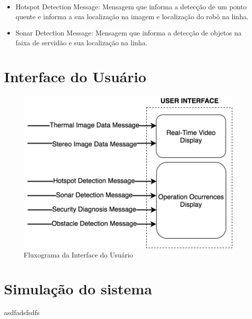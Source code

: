     \begin{itemize}
        	\item Hotspot Detection Message: Mensagem que informa a detecção de um ponto quente e informa a sua localização na imagem e localização do robô na linha.
            \item Sonar Detection Message: Mensagem que informa a detecção de objetos na faixa de servidão e sua localização na linha.
    \end{itemize}
    \pagebreak

\section{Interface do Usuário}
\label{sec:ui}
    \begin{figure}[!ht]
	\centering
	\includegraphics[width=16cm]{Figures/Fluxograma_Interface.jpg}
	\caption{Fluxograma da Interface do Usuário} \label{UI}
	\end{figure}
	


\pagebreak
\newpage
\section{Simulação do sistema}
\label{sec:sim}
asdfadsfsdfs



